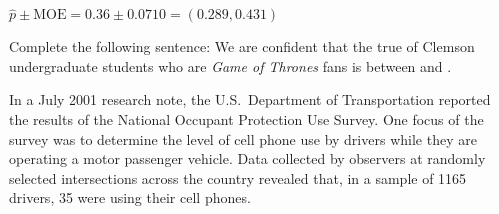 \documentclass[noanswers]{exam}
\begin{document}
\begin{questions}
\begin{solution}[\stretch{1}]
\vspace{1mm}
$\hat{p}\pm \text{MOE}=0.36\pm 0.0710=(0.289,0.431)$
\vspace{1mm}
\end{solution}

\question Complete the following sentence: We are \fillin[93\%] confident that the true \fillin[proportion] of Clemson undergraduate students who are \textit{Game of Thrones} fans is between \fillin[0.289] and \fillin[0.431].

\newpage

\question In a July 2001 research note, the U.S.\ Department of Transportation reported the results of the National Occupant Protection Use Survey. One focus of the survey was to determine the level of cell phone use by drivers while they are operating a motor passenger vehicle. Data collected by observers at randomly selected intersections across the country revealed that, in a sample of 1165 drivers, 35 were using their cell phones.

\vspace{3mm}

\end{questions}
\end{document}
